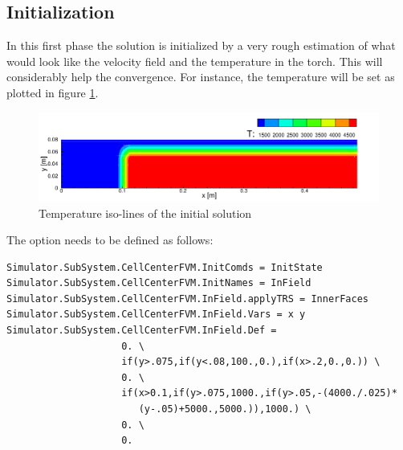 \documentclass[11pt]{article}
\begin{document}
\subsection{Initialization}
In this first phase the solution is initialized by a very rough estimation of what would look like the velocity field and the 
temperature in the torch. This will considerably help the convergence. For instance, the temperature will be set as plotted in figure \ref{fig:inittorch}.
\begin{figure}[htbp]
 \includegraphics[width=\textwidth]{torch_T_initial.pdf}
\caption{Temperature iso-lines of the initial solution}\label{fig:inittorch}
\end{figure}
The option needs to be defined as follows:
\begin{verbatim}
Simulator.SubSystem.CellCenterFVM.InitComds = InitState
Simulator.SubSystem.CellCenterFVM.InitNames = InField
Simulator.SubSystem.CellCenterFVM.InField.applyTRS = InnerFaces
Simulator.SubSystem.CellCenterFVM.InField.Vars = x y
Simulator.SubSystem.CellCenterFVM.InField.Def = 
                    0. \
                    if(y>.075,if(y<.08,100.,0.),if(x>.2,0.,0.)) \
                    0. \
                    if(x>0.1,if(y>.075,1000.,if(y>.05,-(4000./.025)*
                       (y-.05)+5000.,5000.)),1000.) \
                    0. \
                    0.
\end{verbatim}
\end{document}
